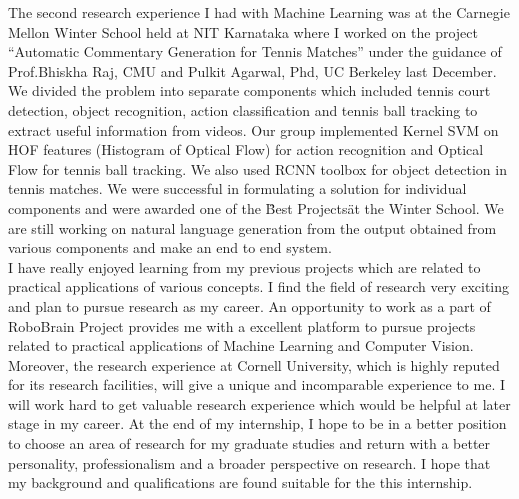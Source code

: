 \documentclass{article}
\begin{document}
The second research experience I had with Machine Learning was at the Carnegie Mellon Winter School held at  NIT Karnataka where I worked on the project “Automatic Commentary Generation for Tennis Matches” under the guidance of Prof.Bhiskha Raj, CMU and Pulkit Agarwal, Phd, UC Berkeley last December. We divided the problem into separate components which included tennis court detection, object recognition, action classification and tennis ball tracking to extract useful information from videos. Our group implemented Kernel SVM on HOF features (Histogram of Optical Flow) for action recognition and Optical Flow for tennis ball tracking. We also used RCNN toolbox for object detection in tennis matches. We were successful in formulating a solution for individual components and were awarded one of the \"Best Projects\" at the Winter School. We are still working on natural language generation from the output obtained from various components and make an end to end system. \\


I have really enjoyed learning from my previous projects which are related to practical applications of various concepts. I find the field of research very exciting and plan to pursue research as my career. 
An opportunity to work as a part of RoboBrain Project provides me with a excellent platform to pursue projects related to practical applications of Machine Learning and Computer Vision. Moreover, the research experience at Cornell University, which is highly reputed for its research facilities, will give a unique and incomparable experience to me. I will work hard to get valuable research experience which would be helpful at later stage in my career. At the end of my internship, I hope to be in a better position to choose an area of research for my graduate studies and return with a better personality, professionalism and a broader perspective on research. I hope that my background and qualifications are found suitable for the this internship. \\
\end{document}
